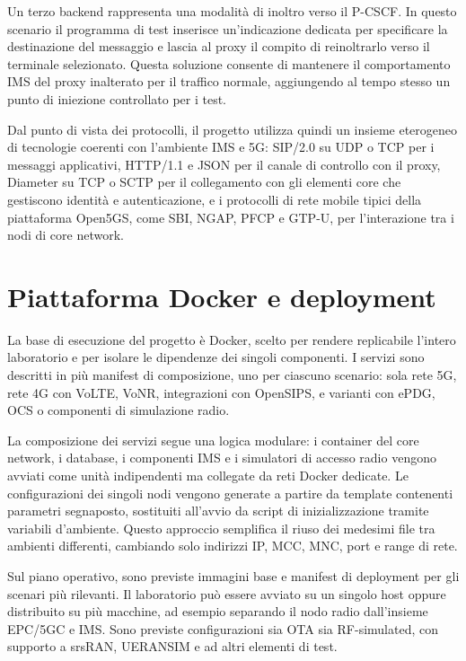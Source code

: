 Un terzo backend rappresenta una modalit\`a di inoltro verso il P-CSCF. In questo scenario il programma di test inserisce un'indicazione dedicata per specificare la destinazione del messaggio e lascia al proxy il compito di reinoltrarlo verso il terminale selezionato. Questa soluzione consente di mantenere il comportamento IMS del proxy inalterato per il traffico normale, aggiungendo al tempo stesso un punto di iniezione controllato per i test.

Dal punto di vista dei protocolli, il progetto utilizza quindi un insieme eterogeneo di tecnologie coerenti con l'ambiente IMS e 5G: SIP/2.0 su UDP o TCP per i messaggi applicativi, HTTP/1.1 e JSON per il canale di controllo con il proxy, Diameter su TCP o SCTP per il collegamento con gli elementi core che gestiscono identit\`a e autenticazione, e i protocolli di rete mobile tipici della piattaforma Open5GS, come SBI, NGAP, PFCP e GTP-U, per l'interazione tra i nodi di core network.

\section{Piattaforma Docker e deployment}

La base di esecuzione del progetto \`e Docker, scelto per rendere replicabile l'intero laboratorio e per isolare le dipendenze dei singoli componenti. I servizi sono descritti in pi\`u manifest di composizione, uno per ciascuno scenario: sola rete 5G, rete 4G con VoLTE, VoNR, integrazioni con OpenSIPS, e varianti con ePDG, OCS o componenti di simulazione radio.

La composizione dei servizi segue una logica modulare: i container del core network, i database, i componenti IMS e i simulatori di accesso radio vengono avviati come unit\`a indipendenti ma collegate da reti Docker dedicate. Le configurazioni dei singoli nodi vengono generate a partire da template contenenti parametri segnaposto, sostituiti all'avvio da script di inizializzazione tramite variabili d'ambiente. Questo approccio semplifica il riuso dei medesimi file tra ambienti differenti, cambiando solo indirizzi IP, MCC, MNC, port e range di rete.

Sul piano operativo, sono previste immagini base e manifest di deployment per gli scenari pi\`u rilevanti. Il laboratorio pu\`o essere avviato su un singolo host oppure distribuito su pi\`u macchine, ad esempio separando il nodo radio dall'insieme EPC/5GC e IMS. Sono previste configurazioni sia OTA sia RF-simulated, con supporto a srsRAN, UERANSIM e ad altri elementi di test.

